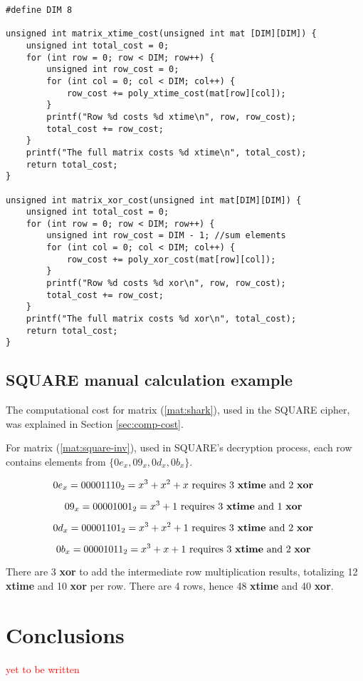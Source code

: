 \documentclass{report}
\begin{document}
\begin{verbatim}
#define DIM 8

unsigned int matrix_xtime_cost(unsigned int mat [DIM][DIM]) {
	unsigned int total_cost = 0;
	for (int row = 0; row < DIM; row++) {
		unsigned int row_cost = 0;
		for (int col = 0; col < DIM; col++) {
			row_cost += poly_xtime_cost(mat[row][col]);
		}
		printf("Row %d costs %d xtime\n", row, row_cost);
		total_cost += row_cost;
	}
	printf("The full matrix costs %d xtime\n", total_cost);
	return total_cost;
}

unsigned int matrix_xor_cost(unsigned int mat[DIM][DIM]) {
	unsigned int total_cost = 0;
	for (int row = 0; row < DIM; row++) {
		unsigned int row_cost = DIM - 1; //sum elements
		for (int col = 0; col < DIM; col++) {
			row_cost += poly_xor_cost(mat[row][col]);
		}
		printf("Row %d costs %d xor\n", row, row_cost);
		total_cost += row_cost;
	}
	printf("The full matrix costs %d xor\n", total_cost);
	return total_cost;
}
\end{verbatim}

\subsection{SQUARE manual calculation example}
The computational cost for matrix (\ref{mat:shark}), used in the SQUARE cipher, was explained in Section \ref{sec:comp-cost}.

For matrix (\ref{mat:square-inv}), used in SQUARE's decryption process, each row contains elements from $\{0e_x, 09_x, 0d_x, 0b_x\}$.

\begin{equation*}
0e_x = 00001110_2 = x^3 + x^2 + x \text{ requires 3 \textbf{xtime} and 2 \textbf{xor} }
\end{equation*}

\begin{equation*}
09_x = 00001001_2 = x^3 + 1 \text{ requires 3 \textbf{xtime} and 1 \textbf{xor} }
\end{equation*}

\begin{equation*}
0d_x = 00001101_2 = x^3 + x^2 + 1 \text{ requires 3 \textbf{xtime} and 2 \textbf{xor} }
\end{equation*}

\begin{equation*}
0b_x = 00001011_2 = x^3 + x + 1 \text{ requires 3 \textbf{xtime} and 2 \textbf{xor} }
\end{equation*}

There are 3 \textbf{xor} to add the intermediate row multiplication results, totalizing 12 \textbf{xtime} and 10 \textbf{xor} per row. There are 4 rows, hence 48 \textbf{xtime} and 40 \textbf{xor}.

\section{Conclusions}
\textcolor{red}{yet to be written}



\end{document}
